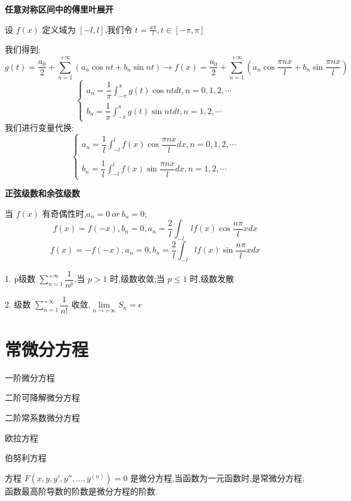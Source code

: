 \textbf{任意对称区间中的傅里叶展开}
\begin{definition}
	设 $f(x)$ 定义域为 $[-l,l]$,我们令 $t=\frac{x\pi}{l},t\in[-\pi,\pi]$

	我们得到:
	$$g(t)=\frac{a_{0}}{2}+\sum\limits_{n=1}^{+\infty}(a_{n}\cos nt+b_{n}\sin nt)\rightarrow f(x)=\frac{a_{0}}{2}+\sum\limits_{n=1}^{+\infty}(a_{n}\cos \dfrac{\pi nx}{l}+b_{n}\sin \dfrac{\pi nx}{l})$$
	$$\left\lbrace \begin{array}{l}
			a_{n}=\dfrac{1}{\pi}\int_{-\pi}^{\pi}g(t)\cos ntdt,n=0,1,2,\cdots \\
			b_{n}=\dfrac{1}{\pi}\int_{-\pi}^{\pi}g(t)\sin ntdt,n=1,2,\cdots
		\end{array}\right. $$
	我们进行变量代换:
	$$\left\lbrace \begin{array}{l}
			a_{n}=\dfrac{1}{l}\int_{-l}^{l}f(x)\cos \dfrac{\pi nx}{l}dx,n=0,1,2,\cdots \\
			\\
			b_{n}=\dfrac{1}{l}\int_{-l}^{l}f(x)\sin \dfrac{\pi nx}{l}dx,n=1,2,\cdots
		\end{array}\right. $$
\end{definition}
\textbf{正弦级数和余弦级数}

当 $f(x)$ 有奇偶性时,$a_{n}=0 \ or\ b_{n}=0$;
$$f(x)=f(-x),b_{n}=0,a_{n}=\dfrac{2}{l}\int_{-l}{l}f(x)\cos \dfrac{n\pi}{l}xdx$$
$$f(x)=-f(-x),a_{n}=0,b_{n}=\dfrac{2}{l}\int_{-l}{l}f(x)\sin \dfrac{n\pi}{l}xdx$$
\begin{anymark}[总结]\label{mark: $p$级数}
	1. p级数 $\sum\limits_{n=1}^{+\infty}\dfrac{1}{n^{p}}$,当 $p>1$ 时,级数收敛;当 $p\leq 1$ 时,级数发散

	2. 级数 $\sum\limits_{n=1}^{+\infty}\dfrac{1}{n!}$ 收敛,$\lim\limits_{n\rightarrow+\infty}S_{n}=e$
\end{anymark}
\chapter{常微分方程}
\begin{introduction}
	\item 一阶微分方程
	\item 二阶可降解微分方程
	\item 二阶常系数微分方程
	\item 欧拉方程
	\item 伯努利方程
\end{introduction}
\begin{definition}
	方程 $F(x,y,y',y'',\dots,y^{(n)})=0$ 是微分方程,当函数为一元函数时,是常微分方程;函数最高阶导数的阶数是微分方程的阶数.
\end{definition}
